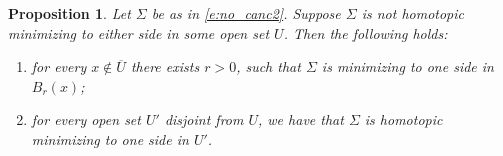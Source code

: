 \documentclass[12pt,twoside]{amsart}
\numberwithin{equation}{section}
\newtheorem{proposition}[theorem]{Proposition}
\begin{document}
\begin{proposition}
\label{p:pairs}
Let $\Sigma$ be as in \eqref{e:no_canc2}. 
Suppose $\Sigma$ is not homotopic minimizing to either side
in some  open set $U$. Then the following holds:
\begin{enumerate}
    \item for every $x \not\in \overline{U}$ there exists $r>0$, such that
$\Sigma$ is minimizing to one side in $B_r(x)$;
    \item for every open set $U'$ disjoint from $U$,
    we have that $\Sigma$ is homotopic minimizing
    to one side in $U'$.
\end{enumerate}

\end{proposition}	
\end{document}
